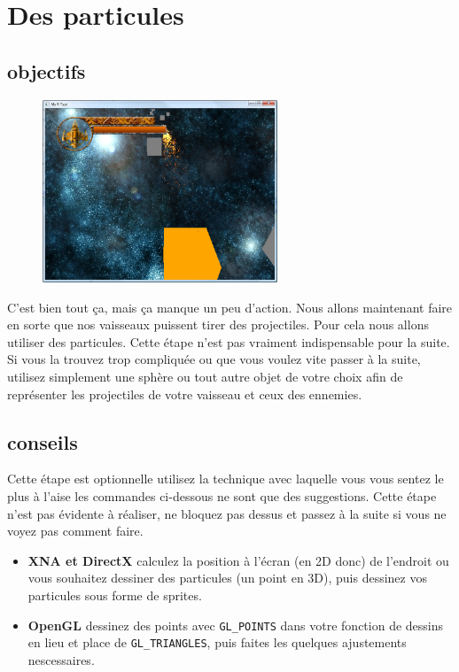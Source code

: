 \documentclass[12pt,a4paper]{report}
\begin{document}
\section{Des particules}
\subsection{objectifs}
\begin{figure}[!h]\centering\includegraphics[width=7cm]{particles_window.png}\end{figure}
C'est bien tout ça, mais ça manque un peu d'action. Nous allons maintenant
faire en sorte que nos vaisseaux puissent tirer des projectiles.
Pour cela nous allons utiliser des particules. Cette étape n'est pas vraiment
indispensable pour la suite. Si vous la trouvez trop compliquée ou que vous
voulez vite passer à la suite, utilisez simplement une sphère ou tout autre objet de
votre choix afin de représenter les projectiles de votre vaisseau et ceux des ennemies.
\subsection{conseils}
Cette étape est optionnelle utilisez la technique avec laquelle vous vous sentez le plus à l'aise
les commandes ci-dessous ne sont que des suggestions. Cette étape n'est pas évidente à réaliser,
ne bloquez pas dessus et passez à la suite si vous ne voyez pas comment faire.
\begin{itemize}
\item \textbf{XNA et DirectX} calculez la position à l'écran (en 2D donc) de l'endroit ou vous souhaitez dessiner des particules (un point en 3D), puis dessinez vos particules sous forme de sprites.
\item \textbf{OpenGL} dessinez des points avec \verb+GL_POINTS+ dans votre fonction de dessins en lieu et place de \verb+GL_TRIANGLES+, puis faites les quelques ajustements nescessaires.
\end{itemize}
\newpage
\end{document}
